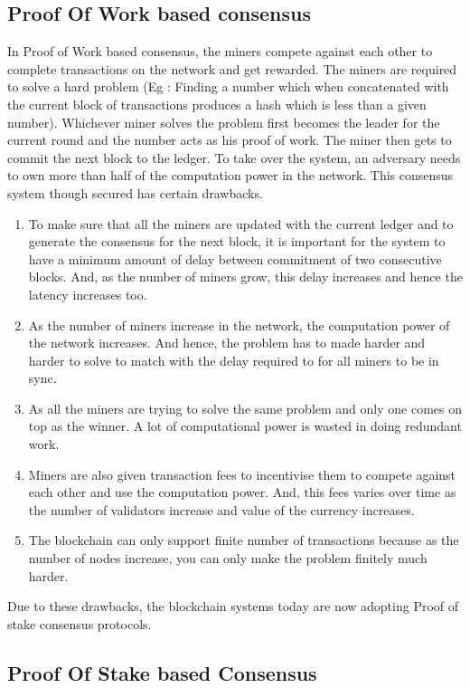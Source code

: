 \subsection{Proof Of Work based consensus}

In Proof of Work based consensus, the miners compete against each other to complete transactions on the network and get rewarded. The miners are required to solve a hard problem (Eg : Finding a number which when concatenated with the current block of transactions produces a hash which is less than a given number). Whichever miner solves the problem first becomes the leader for the current round and the number acts as his proof of work. The miner then gets to commit the next block to the ledger. To take over the system, an adversary needs to own more than half of the computation power in the network. This consensus system though secured has certain drawbacks. 
\begin{enumerate}
  \item To make sure that all the miners are updated with the current ledger and to generate the consensus for the next block, it is important for the system to have a minimum amount of delay between commitment of two consecutive blocks. And, as the number of miners grow, this delay increases and hence the latency increases too.
  \item As the number of miners increase in the network, the computation power of the network increases. And hence, the problem has to made harder and harder to solve to match with the delay required to for all miners to be in sync.
  \item As all the miners are trying to solve the same problem and only one comes on top as the winner. A lot of computational power is wasted in doing redundant work.
  \item Miners are also given transaction fees to incentivise them to compete against each other and use the computation power. And, this fees varies over time as the number of validators increase and value of the currency increases.
  \item The blockchain can only support finite number of transactions because as the number of nodes increase, you can only make the problem finitely much harder.
\end{enumerate}

Due to these drawbacks, the blockchain systems today are now adopting Proof of stake consensus protocols.

\subsection{Proof Of Stake based Consensus}


